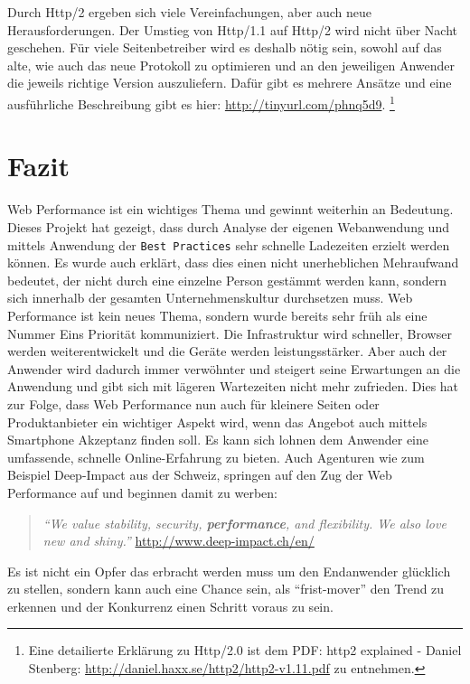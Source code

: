 			Durch Http/2 ergeben sich viele Vereinfachungen, aber auch neue Herausforderungen. Der Umstieg von Http/1.1 auf Http/2 wird nicht über Nacht geschehen. Für viele Seitenbetreiber wird es deshalb nötig sein, sowohl auf das alte, wie auch das neue Protokoll zu optimieren und an den jeweiligen Anwender die jeweils richtige Version auszuliefern. Dafür gibt es mehrere Ansätze und eine ausführliche Beschreibung gibt es hier: \url{http://tinyurl.com/phnq5d9}. \footnote{Eine detailierte Erklärung zu Http/2.0 ist dem PDF: http2 explained - Daniel Stenberg: \url{http://daniel.haxx.se/http2/http2-v1.11.pdf} zu entnehmen.}



\pagebreak
%
%


\section{Fazit} %
\label{sec:fazit}
	Web Performance ist ein wichtiges Thema und gewinnt weiterhin an Bedeutung. Dieses Projekt hat gezeigt, dass durch Analyse der eigenen Webanwendung und mittels Anwendung der \texttt{Best Practices} sehr schnelle Ladezeiten erzielt werden können. Es wurde auch erklärt, dass dies einen nicht unerheblichen Mehraufwand bedeutet, der nicht durch eine einzelne Person gestämmt werden kann, sondern sich innerhalb der gesamten Unternehmenskultur durchsetzen muss. Web Performance ist kein neues Thema, sondern wurde bereits sehr früh als eine Nummer Eins Priorität kommuniziert. Die Infrastruktur wird schneller, Browser werden weiterentwickelt und die Geräte werden leistungsstärker. Aber auch der Anwender wird dadurch immer verwöhnter und steigert seine Erwartungen an die Anwendung und gibt sich mit lägeren Wartezeiten nicht mehr zufrieden. Dies hat zur Folge, dass Web Performance nun auch für kleinere Seiten oder Produktanbieter ein wichtiger Aspekt wird, wenn das Angebot auch mittels Smartphone Akzeptanz finden soll. Es kann sich lohnen dem Anwender eine umfassende, schnelle Online-Erfahrung zu bieten. Auch Agenturen wie zum Beispiel Deep-Impact aus der Schweiz, springen auf den Zug der Web Performance auf und beginnen damit zu werben:

	\begin{quote}
		\textit{"`We value stability, security, \textbf{performance}, and flexibility. We also love new and shiny."'} \url{http://www.deep-impact.ch/en/} 
	\end{quote}

	Es ist nicht ein Opfer das erbracht werden muss um den Endanwender glücklich zu stellen, sondern kann auch eine Chance sein, als "`frist-mover"' den Trend zu erkennen und der Konkurrenz einen Schritt voraus zu sein.

